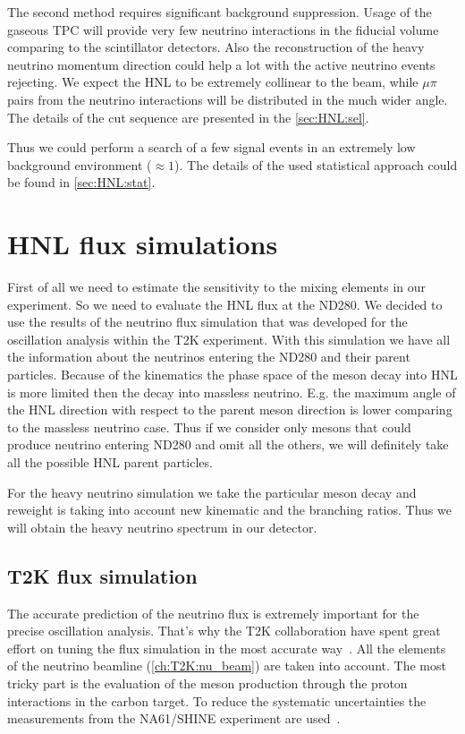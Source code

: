 \documentclass[../main.tex]{subfiles}
\begin{document}
The second method requires significant background suppression. Usage of the gaseous TPC will provide very few neutrino interactions in the fiducial volume comparing to the scintillator detectors. Also the reconstruction of the heavy neutrino momentum direction could help a lot with the active neutrino events rejecting. We expect the HNL to be extremely collinear to the beam, while $\mu\pi$ pairs from the neutrino interactions will be distributed in the much wider angle. The details of the cut sequence are presented in the \autoref{sec:HNL:sel}.

Thus we could perform a search of a few signal events in an extremely low background environment ($\approx1$). The details of the used statistical approach could be found in \autoref{sec:HNL:stat}.

\chapter{HNL flux simulations}
\label{ch:HNL:HNLsim}

First of all we need to estimate the sensitivity to the mixing elements in our experiment. So we need to evaluate the HNL flux at the ND280. We decided to use the results of the neutrino flux simulation that was developed for the oscillation analysis within the T2K experiment. With this simulation we have all the information about the neutrinos entering the ND280 and their parent particles. Because of the kinematics the phase space of the meson decay into HNL is more limited then the decay into massless neutrino. E.g. the maximum angle of the HNL direction with respect to the parent meson direction is lower comparing to the massless neutrino case. Thus if we consider only mesons that could produce neutrino entering ND280 and omit all the others, we will definitely take all the possible HNL parent particles.

For the heavy neutrino simulation we take the particular meson decay and reweight is taking into account new kinematic and the branching ratios. Thus we will obtain the heavy neutrino spectrum in our detector.

\section{T2K flux simulation}
The accurate prediction of the neutrino flux is extremely important for the precise oscillation analysis. That's why the T2K collaboration have spent great effort on tuning the flux simulation in the most accurate way~\cite{Abe2013}. All the elements of the neutrino beamline (\autoref{ch:T2K:nu_beam}) are taken into account. The most tricky part is the evaluation of the meson production through the proton interactions in the carbon target. To reduce the systematic uncertainties the measurements from the NA61/SHINE experiment are used~\cite{Collaboration2018}.
\end{document}
